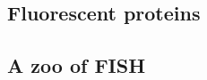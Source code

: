 

\subsection{Fluorescent proteins}
\label{subsec:intro_fluorescence}

\subsection{A zoo of FISH}
\label{subsec:intro_fish}



